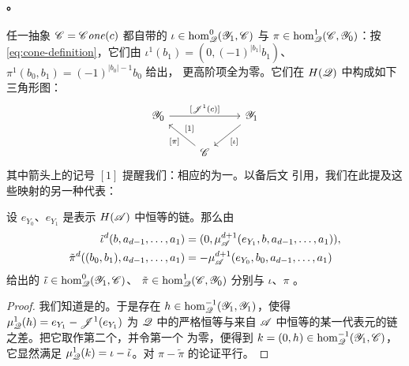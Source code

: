 \paragraph{\trExactTriangle{}。}\label{sub:exact-triangles}
任一抽象\trMappingCone{} $\mathscr{C}=\mathscr{C}\mathit{one}(c)$ 都自带\trCanonical{}的%
\trModule{}\trHomomorphism{} $\iota\in\hom^0_{\mathscr{Q}}(\mathscr{Y}_1,\mathscr{C})$ 与
$\pi\in\hom^1_{\mathscr{Q}}(\mathscr{C},\mathscr{Y}_0)$：按\eqref{eq:cone-definition}，它们由
$\iota^1(b_1)=(0,(-1)^{|b_1|}b_1)$、$\pi^1(b_0,b_1)=(-1)^{|b_0|-1}b_0$ 给出，
更高阶项全为零。它们在 $H(\mathscr{Q})$ 中构成如下三角形图：
\begin{equation}\label{eq:cone-triangle-diagram}
\begin{tikzcd}
\scr{Y}_0 \ar[rr,"{[\scr{J}^1(c)]}"] && \scr{Y}_1 \ar[dl,"{[\iota]}"] \\
& \scr{C} \ar[ul,"{[\pi]}","{[1]}"{swap}] &
\end{tikzcd}
\end{equation}
其中箭头上的记号 $[1]$ 提醒我们：相应的\trMorphism{}\trDegree{}为一。以备后文
引用，我们在此提及这些映射的另一种代表：

\begin{lemma}\label{thm:cone-alternative-representatives}
设 $e_{Y_0}$、$e_{Y_1}$ 是表示 $H(\mathscr{A})$ 中恒等\trMorphism{}的链。那么由
\begin{equation*}
\begin{aligned}
\tilde{\iota}^d(b,a_{d-1},\ldots,a_1)&=(0,\mu^{d+1}_{\mathscr{A}}(e_{Y_1},b,a_{d-1},\ldots,a_1)),\\
\tilde{\pi}^d((b_0,b_1),a_{d-1},\ldots,a_1)&=-\mu^{d+1}_{\mathscr{A}}(e_{Y_0},b_0,a_{d-1},\ldots,a_1)
\end{aligned}
\end{equation*}
给出的\trModule{}\trHomomorphism{} $\tilde{\iota}\in\hom^0_{\mathscr{Q}}(\mathscr{Y}_1,\mathscr{C})$、%
$\tilde{\pi}\in\hom^1_{\mathscr{Q}}(\mathscr{C},\mathscr{Y}_0)$ 分别与 $\iota$、$\pi$
\trCohomology。
\end{lemma}

\begin{proof}
我们知道\trYonedaEmbedding{}是\trCunital{}的。于是存在
$h\in\hom^{-1}_{\mathscr{Q}}(\mathscr{Y}_1,\mathscr{Y}_1)$，使得
$\mu^1_{\mathscr{Q}}(h)=e_{Y_1}-\mathscr{J}^1(e_{Y_1})$ 为 $\mathscr{Q}$ 中的严格恒等与来自
$\mathscr{A}$ 中恒等的某一代表元的链之差。把它取作第二个\trDirectSummand，并令第一个
为零，便得到 $k=(0,h)\in\hom^{-1}_{\mathscr{Q}}(\mathscr{Y}_1,\mathscr{C})$，它显然满足
$\mu^1_{\mathscr{Q}}(k)=\iota-\tilde{\iota}$。对 $\pi-\tilde{\pi}$ 的论证平行。
\end{proof}

